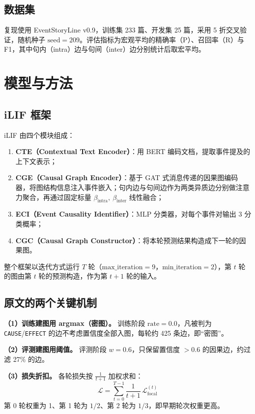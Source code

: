 \documentclass[11pt,a4paper]{ctexart}
\begin{document}
\subsection{数据集}

复现使用 EventStoryLine v0.9，训练集 233 篇、开发集 25 篇，采用 5 折交叉验证，随机种子 $\mathrm{seed}=209$。评估指标为宏观平均的精确率（P）、召回率（R）与 F1，其中句内（intra）边与句间（inter）边分别统计后取宏平均。

\section{模型与方法}

\subsection{iLIF 框架}

iLIF 由四个模块组成：

\begin{enumerate}
\item \textbf{CTE（Contextual Text Encoder）}：用 BERT 编码文档，提取事件提及的上下文表示；
\item \textbf{CGE（Causal Graph Encoder）}：基于 GAT 式消息传递的因果图编码器，将图结构信息注入事件嵌入；句内边与句间边作为两类异质边分别做注意力聚合，再通过固定标量 $\beta_{\mathrm{intra}},\ \beta_{\mathrm{inter}}$ 线性融合；
\item \textbf{ECI（Event Causality Identifier）}：MLP 分类器，对每个事件对输出 3 分类概率；
\item \textbf{CGC（Causal Graph Constructor）}：将本轮预测结果构造成下一轮的因果图。
\end{enumerate}

整个框架以迭代方式运行 $T$ 轮（$\mathrm{max\_iteration}=9$，$\mathrm{min\_iteration}=2$），第 $t$ 轮的图由第 $t$ 轮的预测构造，作为第 $t+1$ 轮的输入。

\subsection{原文的两个关键机制}

\textbf{（1）训练建图用 argmax（密图）。} 训练阶段 $\mathrm{rate}=0.0$，凡被判为 \texttt{CAUSE}/\texttt{EFFECT} 的边不考虑置信度全部入图，每轮约 425 条边，即``密图''。

\textbf{（2）评测建图用阈值。} 评测阶段 $w=0.6$，只保留置信度 $>0.6$ 的因果边，约过滤 27\% 的边。

\textbf{（3）损失折扣。} 各轮损失按 $\frac{1}{t+1}$ 加权求和：
\begin{equation}
\mathcal{L} = \sum_{t=0}^{T-1} \frac{1}{t+1}\,\mathcal{L}_{\mathrm{focal}}^{(t)}
\end{equation}
第 0 轮权重为 1、第 1 轮为 $1/2$、第 2 轮为 $1/3$，即早期轮次权重更高。
\end{document}

